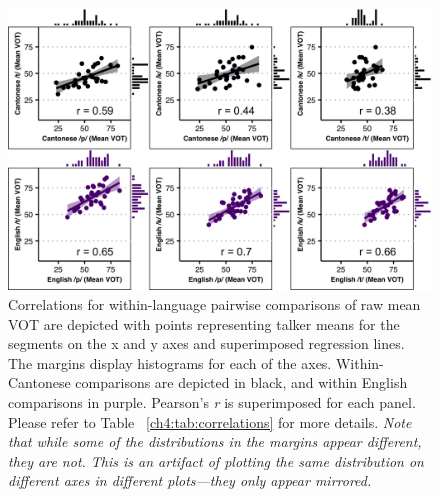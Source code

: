 \begin{figure}[htbp]
  \begin{center}
  \includegraphics[width=0.9\linewidth]{figures/ch4_correlations1_5in.png} 
  \caption{Correlations for within-language pairwise comparisons of raw mean VOT are depicted with points representing talker means for the segments on the x and y axes and superimposed regression lines. The margins display histograms for each of the axes. Within-Cantonese comparisons are depicted in black, and within English comparisons in purple. Pearson's \textit{r} is superimposed for each panel. Please refer to Table ~\ref{ch4:tab:correlations} for more details. \textit{Note that while some of the distributions in the margins appear different, they are not. This is an artifact of plotting the same distribution on different axes in different plots---they only appear mirrored.}}
  \label{ch4:fig:correlations1}
  \end{center}
\end{figure}

